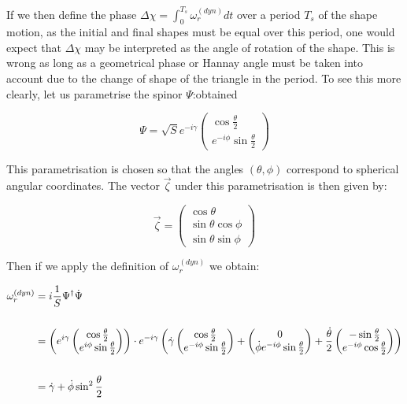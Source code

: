 If we then define the phase $\Delta \chi = \int_0^{T_s}\omega_r^{(dyn)}dt$ over a period $T_s$ of the shape motion, as the initial and final shapes must be equal over this period, one would expect that $\Delta \chi$ may be interpreted as the angle of rotation of the shape. This is wrong as long as a geometrical phase or Hannay angle \cite{hannay} must be taken into account due to the change of shape of the triangle in the period. To see this more clearly, let us parametrise the spinor $\Psi$:obtained

\begin{equation*}
\Psi = \sqrt{S}e^{-i\gamma} \begin{pmatrix}\cos{\frac{\theta}{2}}\\
e^{-i\phi}\sin{\frac{\theta}{2}}\end{pmatrix}
\end{equation*}

This parametrisation is chosen so that the angles $(\theta,\phi)$ correspond to spherical angular coordinates. The vector $\vec{\zeta}$ under this parametrisation is then given by:

\begin{equation*}
\vec{\zeta} = \begin{pmatrix}\cos{\theta} \\ \sin{\theta}\cos{\phi}\\ \sin{\theta}\sin{\phi}\end{pmatrix}
\end{equation*}


Then if we apply the definition of $\omega_r^{(dyn)}$ we obtain:

\begin{align*}
\omega_r^{(dyn)} &= i\frac{1}{S}\Psi^\dagger\dot{\Psi} \\
\\
&= \left( e^{i\gamma}\begin{pmatrix}\cos{\frac{\theta}{2}} \\e^{i\phi}\sin{\frac{\theta}{2}}\end{pmatrix} \right)\cdot e^{-i\gamma}\left( \dot{\gamma}\begin{pmatrix}\cos{\frac{\theta}{2}} \\e^{-i\phi}\sin{\frac{\theta}{2}}\end{pmatrix}+ \begin{pmatrix}0 \\ \dot{\phi}e^{-i\phi}\sin{\frac{\theta}{2}}\end{pmatrix} + \frac{\dot{\theta}}{2}\begin{pmatrix}-\sin{\frac{\theta}{2}} \\e^{-i\phi}\cos{\frac{\theta}{2}}\end{pmatrix} \right)\\
\\
&= \dot{\gamma}+\dot{\phi}\sin^2{\frac{\theta}{2}}
\end{align*}

